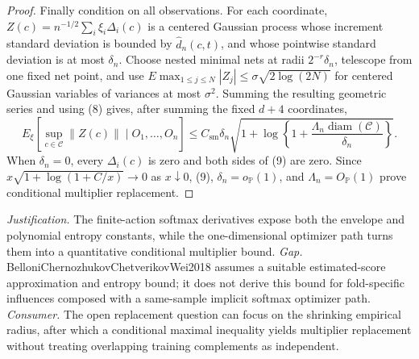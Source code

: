 \documentclass{article}
\begin{document}
\begin{proof}
Finally condition on all observations.  For each coordinate,
\(Z(c)=n^{-1/2}\sum_i\xi_i\Delta_i(c)\) is a centered Gaussian process whose increment standard deviation is bounded by \(\widehat d_n(c,t)\), and whose pointwise standard deviation is at most \(\delta_n\).  Choose nested minimal nets at radii \(2^{-r}\delta_n\), telescope from one fixed net point, and use
\(E\max_{1\leq j\leq N}|Z_j|\leq\sigma\sqrt{2\log(2N)}\) for centered Gaussian variables of variances at most \(\sigma^2\).  Summing the resulting geometric series and using (8) gives, after summing the fixed \(d+4\) coordinates,
\[
 E_\xi\!\left[\sup_{c\in\mathcal C}\|Z(c)\|\mid O_1,\ldots,O_n\right]
 \leq C_{\mathrm{sm}}\delta_n
 \sqrt{1+\log\!\left\{1+\frac{\Lambda_n\operatorname{diam}(\mathcal C)}{\delta_n}\right\}}. \tag{9}
\]
When \(\delta_n=0\), every \(\Delta_i(c)\) is zero and both sides of (9) are zero.  Since \(x\sqrt{1+\log(1+C/x)}\to0\) as \(x\downarrow0\), (9), \(\delta_n=o_{\mathbb P}(1)\), and \(\Lambda_n=O_{\mathbb P}(1)\) prove conditional multiplier replacement.
\end{proof}
\par\smallskip\noindent \textit{Justification.} The finite-action softmax derivatives expose both the envelope and polynomial entropy constants, while the one-dimensional optimizer path turns them into a quantitative conditional multiplier bound. \textit{Gap.} BelloniChernozhukovChetverikovWei2018 assumes a suitable estimated-score approximation and entropy bound; it does not derive this bound for fold-specific influences composed with a same-sample implicit softmax optimizer path. \textit{Consumer.} The open replacement question can focus on the shrinking empirical radius, after which a conditional maximal inequality yields multiplier replacement without treating overlapping training complements as independent.
\end{document}
